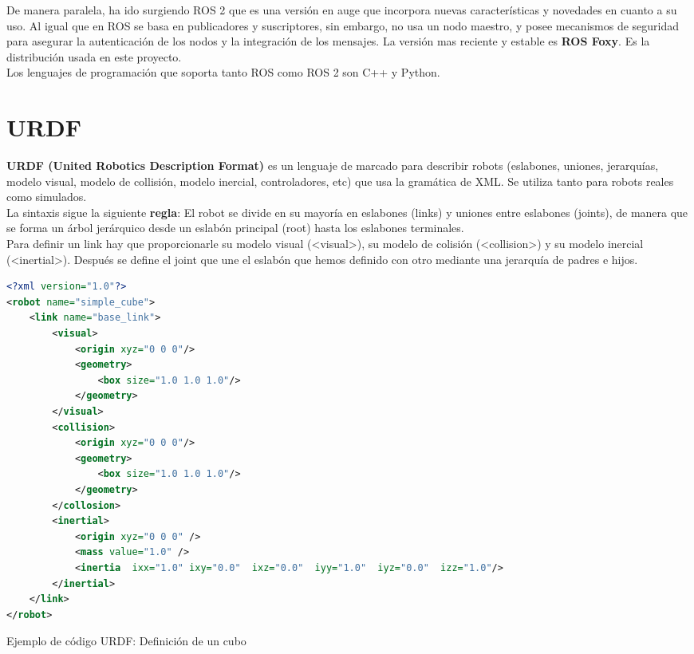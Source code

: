De manera paralela, ha ido surgiendo ROS 2 que es una versión en auge que incorpora nuevas características y novedades en cuanto a su uso. Al igual que en ROS se basa en publicadores y suscriptores, sin embargo, no usa un nodo maestro, y posee mecanismos de seguridad para asegurar la autenticación de los nodos y la integración de los mensajes. La versión mas reciente y estable es \textbf{ROS Foxy}. Es la distribución usada en este proyecto.\\

Los lenguajes de programación que soporta tanto ROS como ROS 2 son C++ y Python.\\

\section{URDF}
\label{sec:urdf}

\textbf{URDF (United Robotics Description Format)} es un lenguaje de marcado para describir robots (eslabones, uniones, jerarquías, modelo visual, modelo de collisión, modelo inercial, controladores, etc) que usa la gramática de XML. Se utiliza tanto para robots reales como simulados.\\

La sintaxis sigue la siguiente \textbf{regla}: El robot se divide en su mayoría en eslabones (links) y uniones entre eslabones (joints), de manera que se forma un árbol jerárquico desde un eslabón principal (root) hasta los eslabones terminales.\\

Para definir un link hay que proporcionarle su modelo visual (<visual>), su modelo de colisión (<collision>) y su modelo inercial (<inertial>). Después se define el joint que une el eslabón que hemos definido con otro mediante una jerarquía de padres e hijos.\\

\begin{code}[h]
\begin{lstlisting}[language=XML]
<?xml version="1.0"?>
<robot name="simple_cube">
	<link name="base_link">
		<visual>
			<origin xyz="0 0 0"/>
			<geometry>
				<box size="1.0 1.0 1.0"/>
			</geometry>
		</visual>
		<collision>
			<origin xyz="0 0 0"/>
			<geometry>
				<box size="1.0 1.0 1.0"/>
			</geometry>
		</collosion>
		<inertial>
			<origin xyz="0 0 0" /> 
			<mass value="1.0" />
			<inertia  ixx="1.0" ixy="0.0"  ixz="0.0"  iyy="1.0"  iyz="0.0"  izz="1.0"/>
		</inertial>
	</link>
</robot>
\end{lstlisting}
\caption[Ejemplo de código URDF: Definición de un cubo]{Ejemplo de código URDF: Definición de un cubo}
\label{cod:codigo_urdf}
\end{code}

